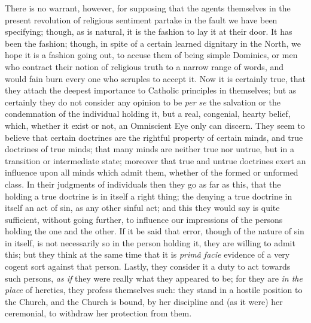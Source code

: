 There is no warrant, however, for supposing that
the agents themselves in the present revolution of religious sentiment
partake in the fault we have been specifying; though, as is natural,
it is the fashion to lay it at their door. It has been the fashion;
though, in spite of a certain learned dignitary in the North, we hope
it is a fashion going out, to accuse them of being simple Dominics, or
men who contract their notion of religious truth to a narrow range of
words, and would fain burn every one who scruples to accept it. Now it
is certainly true, that they attach the deepest importance to Catholic
principles in themselves; but as certainly they do not consider any
opinion to be \emph{per se} the salvation or the condemnation of the
individual holding it, but a real, congenial, hearty belief, which,
whether it exist or not, an Omniscient Eye only can discern. They seem
to believe that certain doctrines are the rightful property of certain
minds, and true doctrines of true minds; that many minds are neither
true nor untrue, but in a transition or intermediate state; moreover
that true and untrue doctrines exert an influence upon all minds which
admit them, whether of the formed or unformed class. In their
judgments of individuals then they go as far as this, that the holding
a true doctrine is in itself a right thing; the denying a true
doctrine in itself an act of sin, as any other sinful act; and this
they would say is quite sufficient, without going further, to
influence our impressions of the persons holding the one and the
other. If it be said that error, though of the nature of sin in
itself, is not necessarily so in the person holding it, they are willing to admit this; but they think at the same time that it is \emph{primâ
facie} evidence of a very cogent sort against that person. Lastly,
they consider it a duty to act towards such persons, \emph{as if} they
were really what they appeared to be; for they are \emph{in the place}
of heretics, they profess themselves such: they stand in a hostile
position to the Church, and the Church is bound, by her discipline and
(as it were) her ceremonial, to withdraw her protection from them.

